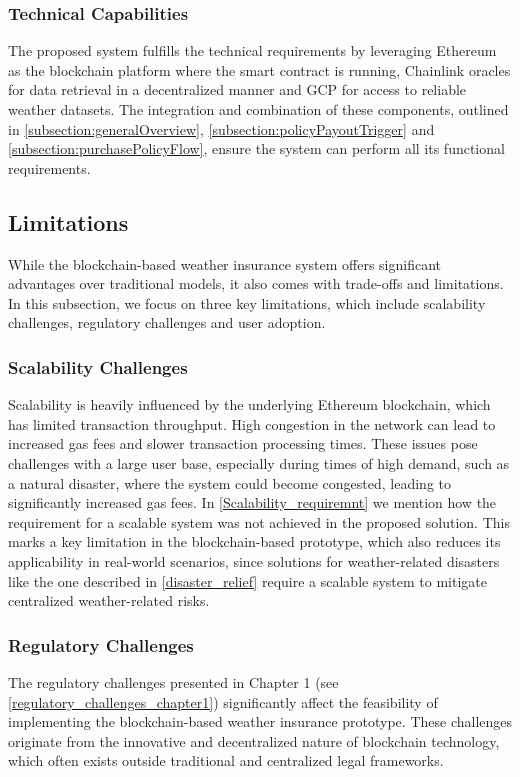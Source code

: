 \subsubsection{Technical Capabilities}
The proposed system fulfills the technical requirements by leveraging Ethereum as the blockchain platform where the smart contract is running, Chainlink oracles for data retrieval in a decentralized manner and GCP for access to reliable weather datasets. The integration and combination of these components, outlined in \cref{subsection:generalOverview}, \cref{subsection:policyPayoutTrigger} and \cref{subsection:purchasePolicyFlow}, ensure the system can perform all its functional requirements.

\subsection{Limitations}\label{analysis_limitations}
While the blockchain-based weather insurance system offers significant advantages over traditional models, it also comes with trade-offs and limitations. In this subsection, we focus on three key limitations, which include scalability challenges, regulatory challenges and user adoption.

\subsubsection{Scalability Challenges}\label{scalability_challenges_analysis}
Scalability is heavily influenced by the underlying Ethereum blockchain, which has limited transaction throughput. High congestion in the network can lead to increased gas fees and slower transaction processing times. These issues pose challenges with a large user base, especially during times of high demand, such as a natural disaster, where the system could become congested, leading to significantly increased gas fees. In \cref{Scalability_requiremnt} we mention how the requirement for a scalable system was not achieved in the proposed solution. This marks a key limitation in the blockchain-based prototype, which also reduces its applicability in real-world scenarios, since solutions for weather-related disasters like the one described in \cref{disaster_relief} require a scalable system to mitigate centralized weather-related risks.

\subsubsection{Regulatory Challenges}
The regulatory challenges presented in Chapter 1 (see \cref{regulatory_challenges_chapter1}) significantly affect the feasibility of implementing the blockchain-based weather insurance prototype. These challenges originate from the innovative and decentralized nature of blockchain technology, which often exists outside traditional and centralized legal frameworks. 

